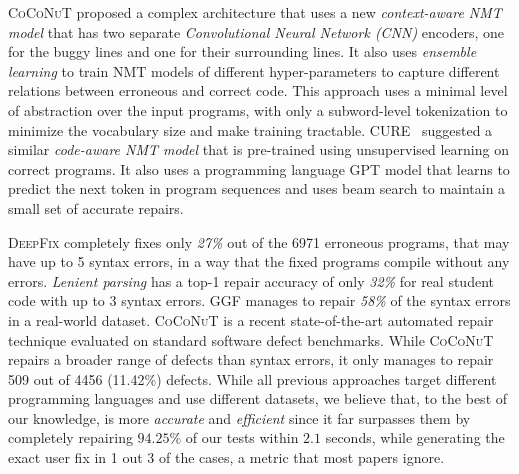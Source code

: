 %
\textsc{CoCoNuT} \citep{Lutellier2020} proposed a complex architecture that uses
a new \emph{context-aware NMT model} that has two separate \emph{Convolutional
Neural Network (CNN)} encoders, one for the buggy lines and one for their
surrounding lines. It also uses \emph{ensemble learning} to train NMT models of
different hyper-parameters to capture different relations between erroneous and
correct code. This approach uses a minimal level of abstraction over the input
programs, with only a subword-level tokenization to minimize the vocabulary size
and make training tractable.
%
\textsc{CURE}~\citep{Jiang_2021} suggested a similar \emph{code-aware NMT model}
that is pre-trained using unsupervised learning on correct programs. It also
uses a programming language \textsc{GPT} \citep{GPT2020} model that learns to
predict the next token in program sequences and uses beam search to maintain a
small set of accurate repairs.


%
\textsc{DeepFix} \citep{Gupta2017} completely fixes only \emph{27\% }out of the 6971
erroneous programs, that may have up to 5 syntax errors, in a way that the fixed
programs compile without any errors.
%
\emph{Lenient parsing} \citep{Ahmed_2021} has a top-1 repair accuracy of only
\emph{32\%} for real student code with up to 3 syntax errors.
%
\textsc{GGF} \citep{Wu2020} manages to repair \emph{58\%} of the syntax errors in a
real-world dataset.
%
\textsc{CoCoNuT} \citep{Lutellier2020} is a recent state-of-the-art automated
repair technique evaluated on standard software defect benchmarks. While
\textsc{CoCoNuT} repairs a broader range of defects than syntax errors, it only
manages to repair 509 out of 4456 (11.42\%) defects.
%
While all previous approaches target different programming languages and use
different datasets, we believe that, to the best of our knowledge, \toolname is
more \emph{accurate} and \emph{efficient} since it far surpasses them by
completely repairing $94.25\%$ of our tests within $2.1$ seconds, while
generating the exact user fix in 1 out 3 of the cases, a metric that most papers
ignore.
